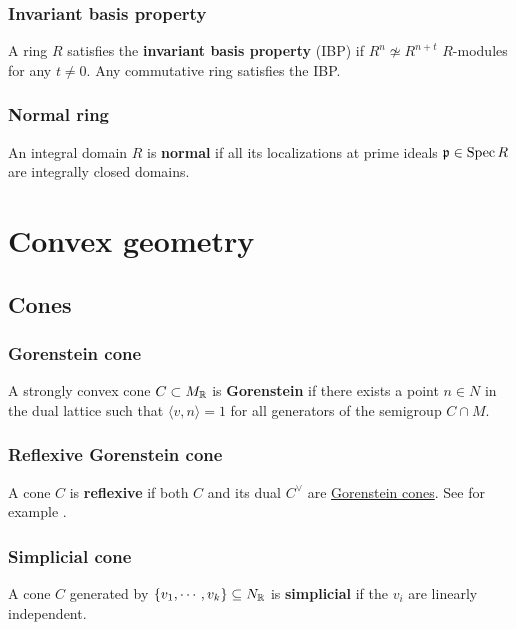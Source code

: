 \documentclass[11pt, english]{article}
\begin{document}
\subsubsection{Invariant basis property}
\label{IBP}

A ring $R$ satisfies the \textbf{invariant basis property} (IBP) if $R^n \not \simeq R^{n+t}$ $R$-modules for any $t \neq 0$. Any commutative ring satisfies the IBP.

\subsubsection{Normal ring}
\label{normalring}

An integral domain $R$ is \textbf{normal} if all its localizations at prime ideals ${\mathfrak{p} \in \operatorname{Spec} R}$ are integrally closed domains.  

\section{Convex geometry}
\subsection{Cones}
\subsubsection{Gorenstein cone}
\label{gorensteincone}

A strongly convex cone $C \subset M_{\mathbb{R}}$ is \textbf{Gorenstein} if there exists a point $n \in N$ in the dual lattice such that $\langle v,n \rangle = 1$ for all generators of the semigroup $C \cap M$.

\subsubsection{Reflexive Gorenstein cone}
\label{reflexivegorensteincone}

A cone $C$ is \textbf{reflexive} if both $C$ and its dual $C^\vee$ are \hyperref[gorensteincone]{Gorenstein cones}. See for example \cite{mirrorsymalggeo}.

\subsubsection{Simplicial cone}
A cone $C$ generated by $\{v_1, \cdots, v_k \} \subseteq N_{\mathbb{R}}$ is \textbf{simplicial} if the $v_i$ are linearly independent.
\end{document}
